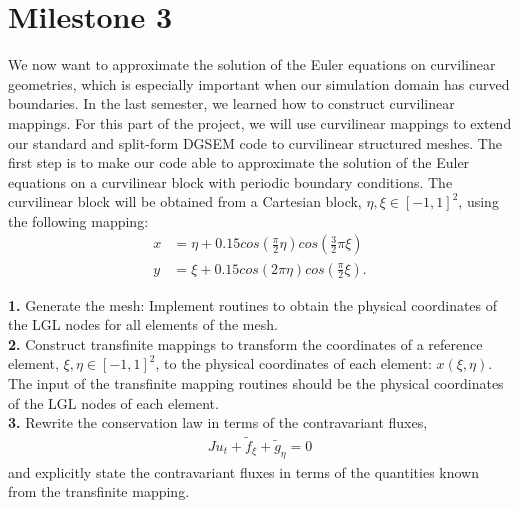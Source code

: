 \documentclass[11pt]{scrartcl}
\begin{document}
\newpage
\section{Milestone 3}
We now want to approximate the solution of the Euler equations on curvilinear geometries, which is especially important when our simulation domain has curved boundaries. In the last semester, we learned how to construct curvilinear mappings. For this part of the project, we will use curvilinear mappings to extend our standard and split-form DGSEM code to curvilinear structured meshes. The first step is to make our code able to approximate the solution of the Euler equations on a curvilinear block with periodic boundary conditions. The curvilinear block will be obtained from a Cartesian block, $ \eta, \xi \in [-1, 1]^2$, using the following mapping:
\begin{align*}
x &= \eta + 0.15 cos\left(\frac{\pi}{2}\eta \right)cos\left(\frac{3}{2}\pi \xi \right) \\
y &= \xi + 0.15 cos\left(2\pi \eta \right) cos\left(\frac{\pi}{2}\xi \right).
\end{align*} 


\textbf{1.} Generate the mesh: Implement routines to obtain the physical coordinates of the LGL nodes for all elements of the mesh.\\
\textbf{2.} Construct transfinite mappings to transform the coordinates of a reference element, $ \xi, \eta \in [-1, 1]^2$, to the physical coordinates of each element: $x(\xi,\eta)$. The input of the transfinite mapping routines should be the physical coordinates of the LGL nodes of each element.\\
\textbf{3.} Rewrite the conservation law in terms of the contravariant fluxes,
\begin{align*}
  J u_t + \tilde{f}_\xi +\tilde{g}_\eta =0
\end{align*}
and explicitly state the contravariant fluxes in terms of the quantities known from the transfinite mapping. \\
\end{document}

